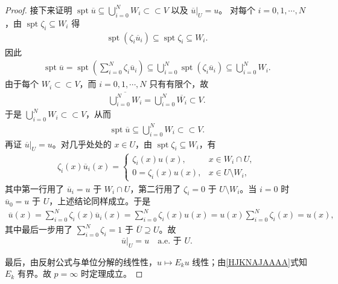 \documentclass[../../main.tex]{subfiles}
\begin{document}
\begin{proof}
接下来证明 $\operatorname{spt}\overline{u}\subseteq\bigcup\limits_{i=0}^{N}W_i\subset\subset V$ 以及 $\overline{u}|_U=u$。
对每个 $i=0,1,\cdots,N$，由 $\operatorname{spt}\zeta_i\subseteq W_i$ 得
\begin{align*}
\operatorname{spt}(\zeta_i\overline{u}_i)
\subseteq\operatorname{spt}\zeta_i
\subseteq W_i.
\end{align*}
因此
\begin{align*}
\operatorname{spt}\overline{u}
=\operatorname{spt}\left(\sum\limits_{i=0}^{N}\zeta_i\overline{u}_i\right)
\subseteq\bigcup\limits_{i=0}^{N}\operatorname{spt}(\zeta_i\overline{u}_i)
\subseteq\bigcup\limits_{i=0}^{N}W_i.
\end{align*}
由于每个 $W_i\subset\subset V$，而 $i=0,1,\cdots,N$ 只有有限个，故
\begin{align*}
\overline{\bigcup\limits_{i=0}^{N}W_i}
=\bigcup\limits_{i=0}^{N}\overline{W_i}\subset V.
\end{align*}
于是 $\bigcup\limits_{i=0}^{N}W_i\subset\subset V$，从而
\begin{align*}
\operatorname{spt}\overline{u}\subseteq\bigcup\limits_{i=0}^{N}W_i\subset\subset V.
\end{align*}
再证 $\overline{u}|_U=u$。对几乎处处的 $x\in U$，由 $\operatorname{spt}\zeta_i\subseteq W_i$，有
\begin{align*}
\zeta_i(x)\overline{u}_i(x)=
\begin{cases}
\zeta_i(x)u(x), & x\in W_i\cap U,\\
0=\zeta_i(x)u(x), & x\in U\setminus W_i,
\end{cases}
\end{align*}
其中第一行用了 $\overline{u}_i=u$ 于 $W_i\cap U$，第二行用了 $\zeta_i=0$ 于 $U\setminus W_i$。当 $i=0$ 时 $\overline{u}_0=u$ 于 $U$，上述结论同样成立。于是
\begin{align*}
\overline{u}(x)
=\sum\limits_{i=0}^{N}\zeta_i(x)\overline{u}_i(x)=\sum\limits_{i=0}^{N}\zeta_i(x)u(x)=u(x)\sum\limits_{i=0}^{N}\zeta_i(x)=u(x),
\end{align*}
其中最后一步用了 $\sum\limits_{i=0}^{N}\zeta_i=1$ 于 $\overline{U}\supseteq U$。故
\[
\overline{u}|_U=u\quad\text{a.e. 于 }U.
\]

最后，由反射公式与单位分解的线性性，$u\mapsto E_ku$ 线性；由\eqref{HJKNAJAAAA}式知$E_k$ 有界。故 $p=\infty$ 时定理成立。
\end{proof}
\end{document}
